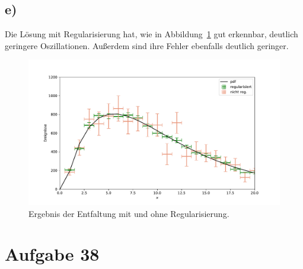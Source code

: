 \documentclass[a4paper, 11pt]{article}
\begin{document}
\subsection*{e)}
Die Lösung mit Regularisierung hat, wie in Abbildung~\ref{fig:realbasis} gut erkennbar, deutlich geringere Oszillationen. Außerdem sind ihre Fehler ebenfalls deutlich geringer.
\begin{figure}[H]
    \centering
    \includegraphics[width=\textwidth]{../A37/Realbasis.pdf}
    \caption{Ergebnis der Entfaltung mit und ohne Regularisierung.}
    \label{fig:realbasis}
\end{figure}

\FloatBarrier


\section*{Aufgabe 38}
\end{document}
